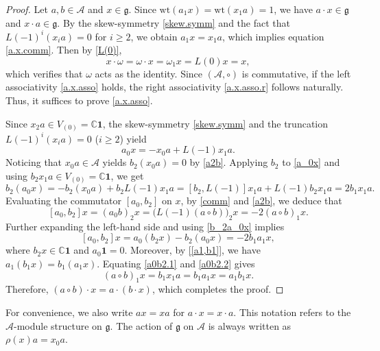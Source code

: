 \documentclass[12pt]{article}
\numberwithin{equation}{section}
\theoremstyle{definition}
\theoremstyle{plain}
\newcommand{\bC}{\ensuremath{\mathbb{C}}}
\newcommand{\fg}{\mathfrak{g}}
\newcommand{\cA}{\ensuremath{\mathcal{A}}}
\newcommand{\bone}{\mathbf{1 }}
\newcommand{\wt}{\mathrm{wt }}
\begin{document}
\begin{proof}
    Let $a,b\in \cA$ and $x\in\fg$. Since $\wt(a_1x)=\wt(x_1a)=1$, we have $a\cdot x\in\fg$ and $x\cdot a\in\fg$. By the skew-symmetry \eqref{skew.symm} and the fact that $L(-1)^i(x_ia)=0$ for $i\ge 2$, we obtain $a_1x=x_1a$, which implies equation \eqref{a.x.comm}. Then by \eqref{L(0)},
    \begin{equation*}
        x\cdot\omega=\omega\cdot x=\omega_1x=L(0)x=x,
    \end{equation*}
    which verifies that $\omega$ acts as the identity. Since $(\cA,\circ)$ is commutative, if the left associativity \eqref{a.x.asso} holds, the right associativity \eqref{a.x.asso.r} follows naturally. Thus, it suffices to prove \eqref{a.x.asso}.

    Since $x_2a\in V_{(0)}=\bC\bone$, the skew-symmetry \eqref{skew.symm} and the truncation $L(-1)^i(x_ia)=0$ ($i\ge 2$) yield
    \begin{equation}\label{a_0x}
        a_0x=-x_0a+L(-1)x_1a.
    \end{equation}
    Noticing that $x_0a\in \cA$ yields $b_2(x_0a)=0$ by \eqref{a2b}. Applying $b_2$ to \eqref{a_0x} and using $b_2x_1a\in V_{(0)}=\bC\bone$, we get
    \begin{equation}\label{b_2a_0x}
        b_2(a_0x)=-b_2(x_0a)+b_2L(-1)x_1a=[b_2,L(-1)]x_1a+L(-1)b_2x_1a=2b_1x_1a.
    \end{equation}
     Evaluating the commutator $[a_0,b_2]$ on $x$, by \eqref{comm} and \eqref{a2b}, we deduce that
    \begin{equation}\label{a0b2.1}
        [a_0,b_2]x=(a_0b)_2x=\big(L(-1)(a\circ b)\big)_2x=-2(a\circ b)_1x.
    \end{equation}
    Further expanding the left-hand side and using \eqref{b_2a_0x} implies
    \begin{equation}\label{a0b2.2}
        [a_0,b_2]x=a_0(b_2x)-b_2(a_0x)=-2b_1a_1x,
    \end{equation}
    where $b_2x\in\bC\bone$ and $a_0\bone=0$. Moreover, by \eqref{[a1,b1]}, we have $a_1(b_1x)=b_1(a_1x)$. Equating \eqref{a0b2.1} and \eqref{a0b2.2} gives
    \begin{equation*}
        (a\circ b)_1x=b_1x_1a=b_1a_1x=a_1b_1x.
    \end{equation*}
    Therefore, $(a\circ b)\cdot x=a\cdot (b\cdot x)$, which completes the proof.
\end{proof}

For convenience, we also write $ax=xa$ for $a\cdot x=x\cdot a$. This notation refers to the $\cA$-module structure on $\fg$. The action of $\fg$ on $\cA$ is always written as $\rho(x)a=x_0a$.
\end{document}
